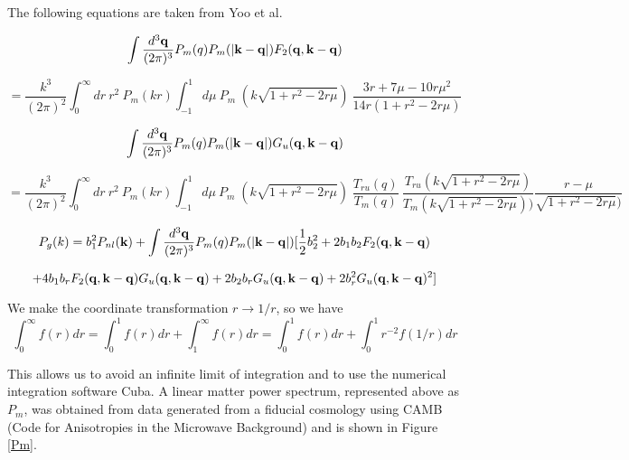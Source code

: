 \documentclass[12pt]{article}
\begin{document}
\maketitle

The following equations are taken from Yoo et al.

$$\int\frac{d^{3}\bf q}{(2\pi)^{3}}P_{m}(q)P_{m}(|{\bf k - q}|) F_{2}({\bf q, k- q})$$

$$= \frac{k^{3}}{(2\pi)^{2}}\int_{0}^{\infty}dr\: r^{2}\: P_{m}(kr)\int_{-1}^{1}d\mu\: P_{m}\;(k\sqrt{1+r^{2}-2r\mu})\:\frac{3r+7\mu-10r\mu^{2}}{14r(1+r^{2}-2r\mu)}$$

$$\int\frac{d^{3}\bf q}{(2\pi)^{3}}P_{m}(q)P_{m}(|{\bf k - q}|) G_{u}({\bf q, k- q})$$

$$= \frac{k^{3}}{(2\pi)^{2}}\int_{0}^{\infty}dr\: r^{2}\: P_{m}(kr)\int_{-1}^{1}d\mu\: P_{m}\;(k\sqrt{1+r^{2}-2r\mu})\;\frac{T_{ru}(q)}{T_{m}(q)}\:\frac{T_{ru}(k\sqrt{1+r^{2}-2r\mu})}{T_{m}(k\sqrt{1+r^{2}-2r\mu}))}\frac{r-\mu}{\sqrt{1+r^{2}-2r\mu})}$$


$$P_{g}(k) = b_{1}^{2}P_{nl}({\bf k}) + \int\frac{d^{3}\bf q}{(2\pi)^{3}}P_{m}(q)P_{m}(|{\bf k - q}|)[\frac{1}{2}b_{2}^{2}+2b_{1}b_{2}F_{2}({\bf q, k- q})$$

$$+4b_{1}b_{r}F_{2}({\bf q, k- q})G_{u}({\bf q, k- q})+2b_{2}b_{r}G_{u}({\bf q, k- q})+2b_{r}^{2}G_{u}({\bf q, k- q})^{2}]$$

We make the coordinate transformation $r \to 1/r $, so we have $$\int_{0}^{\infty} f(r) dr = \int_{0}^{1} f(r) dr + \int_{1}^{\infty} f(r) dr = \int_{0}^{1} f(r) dr +\int_{0}^{1} r^{-2} f(1/r) dr$$

This allows us to avoid an infinite limit of integration and to use the numerical integration software Cuba. A linear matter power spectrum, represented above as $P_{m}$, was obtained from data generated from a fiducial cosmology using CAMB (Code for Anisotropies in the Microwave Background) and is shown in Figure \ref{Pm}.
\end{document}
